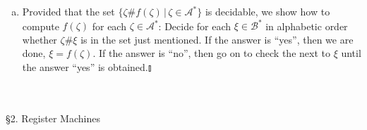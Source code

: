 \begin{enumerate}[1.]
\begin{enumerate}[(a)]
\item Provided that the set $\{ \zeta\#f(\zeta) \,|\, \zeta \in \mathcal{A}^\ast \}$ is decidable, we show how to compute $f(\zeta)$ for each $\zeta \in \mathcal{A}^\ast$: Decide for each $\xi \in \mathcal{B}^\ast$ in alphabetic order whether $\zeta\#\xi$ is in the set just mentioned. If the answer is ``yes'', then we are done, $\xi = f(\zeta)$. If the answer is ``no'', then go on to check the next to $\xi$ until the answer ``yes'' is obtained.\nolinebreak\hfill$\talloblong$
\end{enumerate}
\end{enumerate}
\
\\
\\
{\large \S2. Register Machines}
